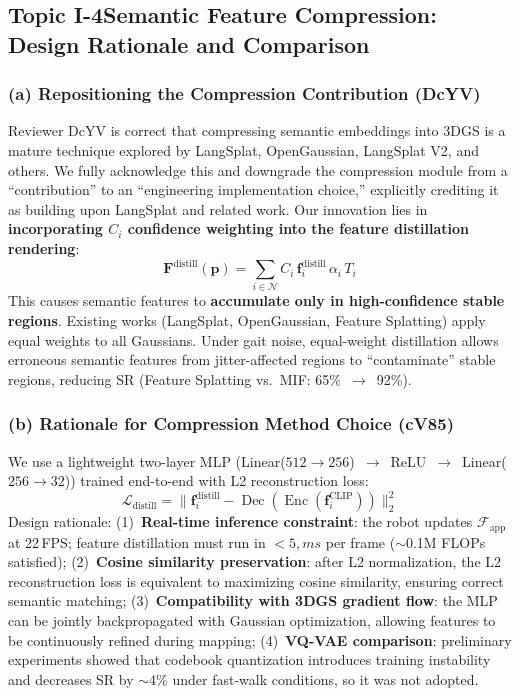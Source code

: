 \documentclass[10pt,a4paper]{article}
\newcommand{\revs}[1]{\smallskip\noindent{\small\color{notegray}\textit{Addressed to: #1}}\smallskip}
\begin{document}
\subsection*{Topic I-4\enspace Semantic Feature Compression: Design Rationale and Comparison}
\revs{5b5U (Q6b), cV85 (Q9), DcYV (Q6, Q9)}

\subsubsection*{(a) Repositioning the Compression Contribution (DcYV)}

Reviewer DcYV is correct that compressing semantic embeddings into 3DGS is a mature technique explored by LangSplat, OpenGaussian, LangSplat V2, and others. We fully acknowledge this and downgrade the compression module from a ``contribution'' to an ``engineering implementation choice,'' explicitly crediting it as building upon LangSplat and related work. Our innovation lies in \textbf{incorporating $C_i$ confidence weighting into the feature distillation rendering}:
\begin{equation}
  \mathbf{F}^{\text{distill}}(\mathbf{p}) = \sum_{i\in\mathcal{N}} C_i\,\mathbf{f}_i^{\text{distill}}\,\alpha_i\,T_i
\end{equation}
This causes semantic features to \textbf{accumulate only in high-confidence stable regions}. Existing works (LangSplat, OpenGaussian, Feature Splatting) apply equal weights to all Gaussians. Under gait noise, equal-weight distillation allows erroneous semantic features from jitter-affected regions to ``contaminate'' stable regions, reducing SR (Feature Splatting vs.\ MIF: 65\%~$\to$~92\%).

\subsubsection*{(b) Rationale for Compression Method Choice (cV85)}

We use a lightweight two-layer MLP (Linear($512\!\to\!256$)~$\to$~ReLU~$\to$~Linear($256\!\to\!32$)) trained end-to-end with L2 reconstruction loss:
\begin{equation}
  \mathcal{L}_{\text{distill}} = \bigl\|\mathbf{f}_i^{\text{distill}} - \operatorname{Dec}(\operatorname{Enc}(\mathbf{f}_i^{\text{CLIP}}))\bigr\|_2^2
\end{equation}
Design rationale: (1)~\textbf{Real-time inference constraint}: the robot updates $\mathcal{F}_{\text{app}}$ at 22\,FPS; feature distillation must run in $<5,ms$ per frame (${\sim}$0.1M FLOPs satisfied); (2)~\textbf{Cosine similarity preservation}: after L2 normalization, the L2 reconstruction loss is equivalent to maximizing cosine similarity, ensuring correct semantic matching; (3)~\textbf{Compatibility with 3DGS gradient flow}: the MLP can be jointly backpropagated with Gaussian optimization, allowing features to be continuously refined during mapping; (4)~\textbf{VQ-VAE comparison}: preliminary experiments showed that codebook quantization introduces training instability and decreases SR by ${\sim}$4\% under fast-walk conditions, so it was not adopted.
\end{document}
